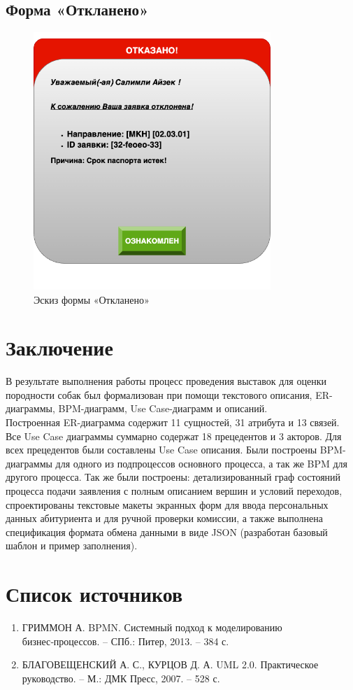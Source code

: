 \documentclass[areasetadvanced]{scrartcl}
\begin{document}
\subsection{Форма «Откланено»}
\begin{figure}[H]
\centering
\includegraphics[width=0.8\textwidth]{images/otkaz.png}
\caption{Эскиз формы «Откланено»}
\end{figure}

\newpage
\section*{Заключение}
В результате выполнения работы процесс проведения выставок для оценки породности собак был формализован при помощи текстового описания, ER-диаграммы, BPM-диаграмм, Use Case-диаграмм и описаний.
    \\
Построенная ER-диаграмма содержит 11 сущностей, 31 атрибута и 13 связей.
Все Use Case диаграммы суммарно содержат 18 прецедентов и 3 акторов. Для всех прецедентов были составлены Use Case описания. Были построены BPM-диаграммы для одного из подпроцессов основного процесса, а так же BPM для другого процесса. Так же были построены: детализированный граф состояний процесса подачи заявления с полным описанием вершин и условий переходов, спроектированы текстовые макеты экранных форм для ввода персональных данных абитуриента и для ручной проверки комиссии, а также выполнена спецификация формата обмена данными в виде JSON (разработан базовый шаблон и пример заполнения). 
\newpage
\section*{Список источников}
\begin{enumerate}
    \item ГРИММОН А. BPMN. Системный подход к моделированию бизнес‑процессов. – СПб.: Питер, 2013. – 384 с.
    \item БЛАГОВЕЩЕНСКИЙ А. С., КУРЦОВ Д. А. UML 2.0. Практическое руководство. – М.: ДМК Пресс, 2007. – 528 с.
\end{enumerate}
\end{document}
